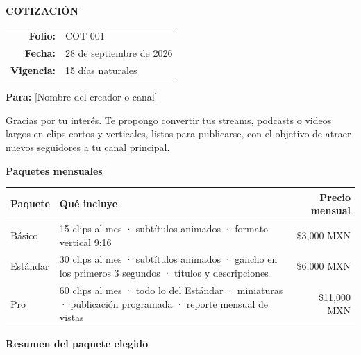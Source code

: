 \documentclass[11pt]{article}
\newcommand{\minombre}{[Tu nombre o marca]}
\newcommand{\cliente}{[Nombre del creador o canal]}
\newcommand{\folio}{COT-001}
\newcommand{\fecha}{28 de septiembre de 2026}
\newcommand{\vigencia}{15 días naturales}
\begin{document}
\vspace*{2.3cm}

{\color{principal}\Large\bfseries COTIZACIÓN}\hfill
\begin{tabular}[t]{@{}r l@{}}
  \textbf{Folio:} & \folio \\
  \textbf{Fecha:} & \fecha \\
  \textbf{Vigencia:} & \vigencia
\end{tabular}

\vspace{0.6cm}
\textbf{Para:} \cliente

\vspace{0.4cm}
Gracias por tu interés. Te propongo convertir tus streams, podcasts o videos largos en clips cortos y
verticales, listos para publicarse, con el objetivo de atraer nuevos seguidores a tu canal principal.

\vspace{0.5cm}
{\color{principal}\large\bfseries Paquetes mensuales}
\vspace{0.2cm}

\renewcommand{\arraystretch}{1.5}
\begin{tabularx}{\textwidth}{@{} l X r @{}}
  \toprule
  \textbf{Paquete} & \textbf{Qué incluye} & \textbf{Precio mensual} \\
  \midrule
  Básico   & 15 clips al mes · subtítulos animados · formato vertical 9:16 & \$3,000 MXN \\
  \rowcolor{suave}
  Estándar & 30 clips al mes · subtítulos animados · gancho en los primeros 3 segundos · títulos y descripciones & \$6,000 MXN \\
  Pro      & 60 clips al mes · todo lo del Estándar · miniaturas · publicación programada · reporte mensual de vistas & \$11,000 MXN \\
  \bottomrule
\end{tabularx}

\vspace{0.6cm}
{\color{principal}\large\bfseries Resumen del paquete elegido}
\vspace{0.2cm}
\end{document}
